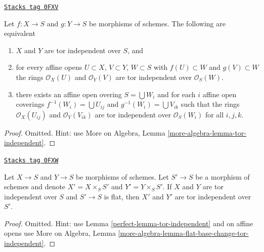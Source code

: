 \begin{lemma}
\label{perfect-lemma-tor-independent}
\href{https://stacks.math.columbia.edu/tag/0FXV}{\texttt{Stacks tag 0FXV}}

Let $f : X \to S$ and $g : Y \to S$ be morphisms of schemes.
The following are equivalent
\begin{enumerate}
\item $X$ and $Y$ are tor independent over $S$, and
\item for every affine opens $U \subset X$, $V \subset Y$, $W \subset S$
with $f(U) \subset W$ and $g(V) \subset W$ the rings
$\mathcal{O}_X(U)$ and $\mathcal{O}_Y(V)$ are tor independent over
$\mathcal{O}_S(W)$.
\item there exists an affine open overing $S = \bigcup W_i$ and
for each $i$ affine open coverings $f^{-1}(W_i) = \bigcup U_{ij}$
and $g^{-1}(W_i) = \bigcup V_{ik}$ such that the rings
$\mathcal{O}_X(U_{ij})$ and $\mathcal{O}_Y(V_{ik})$ are tor independent over
$\mathcal{O}_S(W_i)$ for all $i, j, k$.
\end{enumerate}
\end{lemma}

\begin{proof}
Omitted. Hint: use More on Algebra, Lemma
\ref{more-algebra-lemma-tor-independent}.
\end{proof}

\begin{lemma}
\label{perfect-lemma-flat-base-change-tor-independent}
\href{https://stacks.math.columbia.edu/tag/0FXW}{\texttt{Stacks tag 0FXW}}

Let $X \to S$ and $Y \to S$ be morphisms of schemes. Let $S' \to S$ be a
morphism of schemes and denote $X' = X \times_S S'$
and $Y' = Y \times_S S'$.
If $X$ and $Y$ are tor independent over $S$ and $S' \to S$ is flat,
then $X'$ and $Y'$ are tor independent over $S'$.
\end{lemma}

\begin{proof}

Omitted. Hint: use Lemma \ref{perfect-lemma-tor-independent} and
on affine opens use More on Algebra, Lemma
\ref{more-algebra-lemma-flat-base-change-tor-independent}.
\end{proof}

